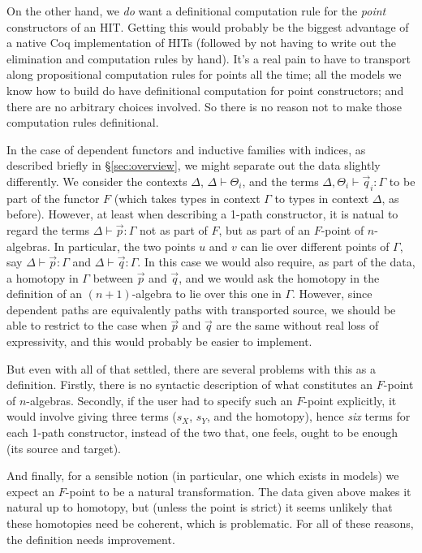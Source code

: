 \documentclass{amsart}
\begin{document}
On the other hand, we \emph{do} want a definitional computation rule for the \emph{point} constructors of an HIT.  Getting this would probably be the biggest advantage of a native Coq implementation of HITs (followed by not having to write out the elimination and computation rules by hand).  It's a real pain to have to transport along propositional computation rules for points all the time; all the models we know how to build do have definitional computation for point constructors; and there are no arbitrary choices involved.  So there is no reason not to make those computation rules definitional.

In the case of dependent functors and inductive families with indices, as described briefly in \S\ref{sec:overview}, we might separate out the data slightly differently.  We consider the contexts $\Delta$, $\Delta\vdash\Theta_i$, and the terms $\Delta,\Theta_i\vdash \vec q_i :\Gamma$ to be part of the functor $F$ (which takes types in context $\Gamma$ to types in context $\Delta$, as before).  However, at least when describing a 1-path constructor, it is natual to regard the terms $\Delta \vdash \vec p : \Gamma$ not as part of $F$, but as part of an $F$-point of $n$-algebras.  In particular, the two points $u$ and $v$ can lie over different points of $\Gamma$, say $\Delta \vdash \vec p : \Gamma$ and $\Delta \vdash \vec q : \Gamma$.  In this case we would also require, as part of the data, a homotopy in $\Gamma$ between $\vec p$ and $\vec q$, and we would ask the homotopy in the definition of an $(n+1)$-algebra to lie over this one in $\Gamma$.  However, since dependent paths are equivalently paths with transported source, we should be able to restrict to the case when $\vec p$ and $\vec q$ are the same without real loss of expressivity, and this would probably be easier to implement.

But even with all of that settled, there are several problems with this as a definition.  Firstly, there is no syntactic description of what constitutes an $F$-point of $n$-algebras.  Secondly, if the user had to specify such an $F$-point explicitly, it would involve giving three terms ($s_X$, $s_Y$, and the homotopy), hence \emph{six} terms for each 1-path constructor, instead of the two that, one feels, ought to be enough (its source and target).

And finally, for a sensible notion (in particular, one which exists in models) we expect an $F$-point to be a natural transformation.  The data given above makes it natural up to homotopy, but (unless the point is strict) it seems unlikely that these homotopies need be coherent, which is problematic.  For all of these reasons, the definition needs improvement.
\end{document}
